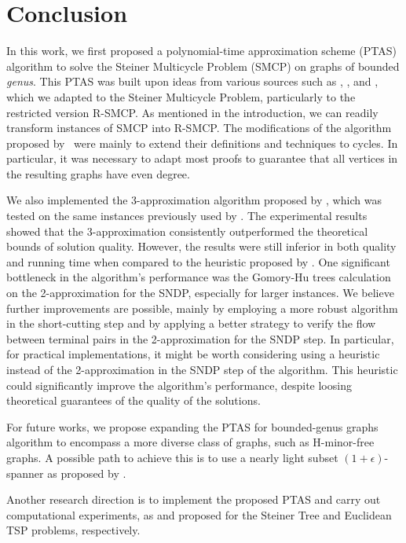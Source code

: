 \chapter{Conclusion}
\label{chapter:conclusion}

In this work, we first proposed a polynomial-time approximation scheme (PTAS) algorithm to solve the Steiner Multicycle Problem (SMCP) on graphs of bounded \textit{genus}. 
This PTAS was built upon ideas from various sources such as \cite{Borradaile2009b}, \cite{Borradaile2012}, and \cite{Bateni}, which we adapted to the Steiner Multicycle Problem, particularly to the restricted version R-SMCP. 
As mentioned in the introduction, we can readily transform instances of SMCP into R-SMCP.
The modifications of the algorithm proposed by~\citeauthor{Bateni} were mainly to extend their definitions and techniques to cycles. 
In particular, it was necessary to adapt most proofs to guarantee that all vertices in the resulting graphs have even degree.   

We also implemented the 3-approximation algorithm proposed by \cite{smcp_3apx}, which was tested on the same instances previously used by \cite{Pereira2018TheSM}. 
The experimental results showed that the 3-approximation consistently outperformed the theoretical bounds of solution quality. However, the results were still inferior in both quality and running time when compared to the heuristic proposed by \cite{Pereira2018TheSM}.
One significant bottleneck in the algorithm's performance was the Gomory-Hu trees calculation on the 2-approximation for the SNDP, especially for larger instances.
We believe further improvements are possible, mainly by employing a more robust algorithm in the short-cutting step and by applying a better strategy to verify the flow between terminal pairs in the 2-approximation for the SNDP step.
In particular, for practical implementations, it might be worth considering using a heuristic instead of the 2-approximation in the SNDP step of the algorithm. This heuristic could significantly improve the algorithm's performance, despite loosing theoretical guarantees of the quality of the solutions.

For future works, we propose expanding the PTAS for bounded-genus graphs algorithm to encompass a more diverse class of graphs, such as H-minor-free graphs. A possible path to achieve this is to use a nearly light subset \((1 + \epsilon)\)-spanner as proposed by \cite{light_spanners_tsp}.

Another research direction is to implement the proposed PTAS and carry out computational experiments, as \cite{TazariLargeConstants} and \cite{implementationPTASeuclidianTSP} proposed for the Steiner Tree and Euclidean TSP problems, respectively.

